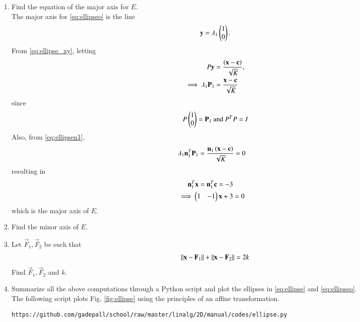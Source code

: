 \documentclass[journal,12pt,twocolumn]{IEEEtran}
\renewcommand\thesection{\arabic{section}}
\begin{document}
\begin{enumerate}[label=\thesection.\arabic*
,ref=\thesection.\theenumi]
\item Find the equation of the major axis for $E$.
\\
\solution  The major axis for \eqref{eq:ellipseo} is the line
\begin{equation}
\mathbf{y} = \lambda_1\begin{pmatrix}1 \\ 0\end{pmatrix}.
\end{equation}
From \eqref{eq:ellipse_xy}, letting
\begin{align}
P\mathbf{y}&= \frac{\left(\mathbf{x}-\mathbf{c}\right)}{\sqrt{K}},
\\ 
\implies  \lambda_1\mathbf{P}_1&= \frac{\mathbf{x}-\mathbf{c}}{\sqrt{K}}
\end{align}
%
since 
\begin{align}
P\begin{pmatrix}1 \\ 0\end{pmatrix}=\mathbf{P}_1\text{ and }P^{T}P = I
\end{align}
Also, from \eqref{eq:ellipsen1},
\begin{align}
\lambda_1\mathbf{n}_1^T\mathbf{P}_1&= \frac{\mathbf{n}_1\left(\mathbf{x}-\mathbf{c}\right)}{\sqrt{K}}=0
\end{align}
%
resulting in
\begin{align}
\mathbf{n}_1^T\mathbf{x}=\mathbf{n}_1^T\mathbf{c}= -3
\\
\implies\begin{pmatrix}1 & -1\end{pmatrix}\mathbf{x}+3&=0
\end{align}
%
which is the major axis of $E$.
\item Find the minor axis of $E$.
%
\item Let $\vec{F}_1,\vec{F}_2$ be such that
\begin{equation}
\lVert\mathbf{x}-\mathbf{F}_1\rVert
+\lVert\mathbf{x}-\mathbf{F}_2\rVert =2k
\end{equation}
Find $\vec{F}_1, \vec{F}_2$ and $k$.
\item Summarize all the above computations through a Python script and plot 
the ellipses in \eqref{eq:ellipse} and \eqref{eq:ellipseo}.
\\
\solution The following script plots Fig. \ref{fig:ellipse} using the 
principles of an affine transformation. 
\begin{lstlisting}
https://github.com/gadepall/school/raw/master/linalg/2D/manual/codes/ellipse.py
\end{lstlisting}
\begin{figure}
\centering

\end{figure}
\end{enumerate}
\end{document}

